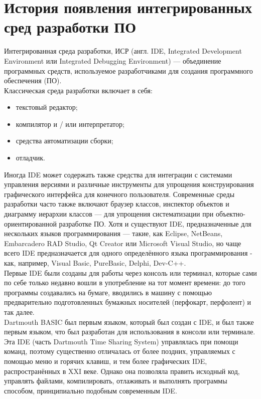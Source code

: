 \chapter{История появления интегрированных сред разработки ПО}
\label{cha:ch_1}
Интегрированная среда разработки, ИСР (англ. IDE, Integrated Development Environment или Integrated Debugging Environment) — объединение программных средств, используемое разработчиками для создания программного обеспечения (ПО).\\
Классическая среда разработки включает в себя:\\
\begin{itemize}
    \item текстовый редактор;\\
    \item компилятор и / или интерпретатор;\\
    \item средства автоматизации сборки;\\
    \item отладчик.\\
\end{itemize}
Иногда IDE может содержать также средства для интеграции с системами управления версиями и различные инструменты для упрощения конструирования графического интерфейса для конечного пользователя. 
Современные среды разработки часто также включают браузер классов, инспектор объектов и диаграмму иерархии классов — для упрощения систематизации при объектно-ориентированной разработке ПО. 
Хотя и существуют IDE, предназначенные для нескольких языков программирования — такие, как Eclipse, NetBeans, Embarcadero RAD Studio, Qt Creator или Microsoft Visual Studio, но чаще всего IDE предназначается для одного определённого языка программирования - как, например, Visual Basic, PureBasic, Delphi, Dev-C++.\\

Первые IDE были созданы для работы через консоль или терминал, которые сами по себе только недавно вошли в употребление на тот момент времени: до того программы создавались на бумаге, вводились в машину с помощью предварительно подготовленных бумажных носителей (перфокарт, перфолент) и так далее.\\

Dartmouth BASIC был первым языком, который был создан с IDE, и был также первым языком, что был разработан для использования в консоли или терминале. Эта IDE (часть Dartmouth Time Sharing System) управлялась при помощи команд, поэтому существенно отличалась от более поздних, управляемых с помощью меню и горячих клавиш, и тем более графических IDE, распространённых в XXI веке. Однако она позволяла править исходный код, управлять файлами, компилировать, отлаживать и выполнять программы способом, принципиально подобным современным IDE.\\

